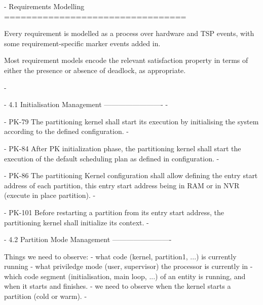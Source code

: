 {- Requirements Modelling =================================

 Every requirement is modelled as a process over hardware and TSP events,
 with some requirement-specific marker events added in.

 Most requirement models encode the relevant satisfaction property in terms
 of either the presence or absence of deadlock, as appropriate.

-}


{- 4.1 Initialisation Management ------------------------- -}

{- PK-79
The partitioning kernel shall start its execution by initialising the system according to the defined configuration.
-}

{- PK-84
After PK initialization phase, the partitioning kernel shall start the execution of the default scheduling plan as defined in configuration.
-}

{- PK-86
The partitioning Kernel configuration shall allow defining the entry start address of each partition, this entry start address being in RAM or in NVR (execute in place partition).
-}

{- PK-101
Before restarting a partition from its entry start address, the partitioning kernel shall initialize its context.
-}

{- 4.2 Partition Mode Management -------------------------

Things we need to observe:
  - what code (kernel, partition1, ...) is currently running
  - what priviledge mode (user, supervisor) the processor is currently in
  - which code segment (initialisation, main loop, ...) of an entity is running,
    and when it starts and finishes.
  - we need to observe when the kernel starts a partition (cold or warm).
-}


